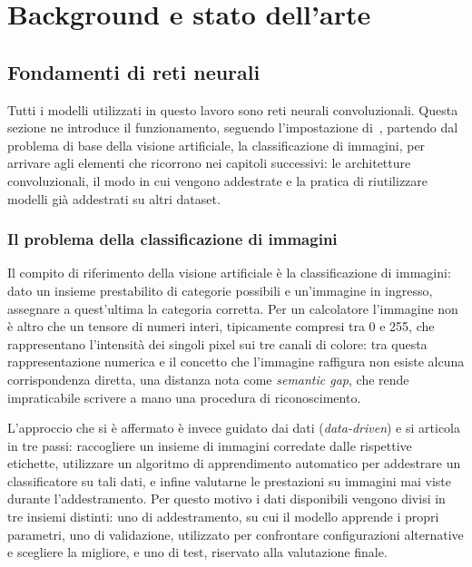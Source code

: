 \chapter{Background e stato dell'arte}
\label{chap:stato_arte}

\section{Fondamenti di reti neurali}
\label{sec:fondamenti_nn}

Tutti i modelli utilizzati in questo lavoro sono reti neurali
convoluzionali. Questa sezione ne introduce il funzionamento, seguendo
l'impostazione di~\cite{goodfellow2016deep}, partendo
dal problema di base della visione artificiale, la classificazione di
immagini, per arrivare agli elementi che ricorrono nei capitoli
successivi: le architetture convoluzionali, il modo in cui vengono
addestrate e la pratica di riutilizzare modelli già addestrati su altri
dataset.

\subsection{Il problema della classificazione di immagini}
\label{sec:classificazione}

Il compito di riferimento della visione artificiale è la classificazione
di immagini: dato un insieme prestabilito di categorie possibili e
un'immagine in ingresso, assegnare a quest'ultima la categoria corretta.
Per un calcolatore l'immagine non è altro che un tensore di numeri
interi, tipicamente compresi tra 0 e 255, che rappresentano l'intensità
dei singoli pixel sui tre canali di colore: tra questa rappresentazione
numerica e il concetto che l'immagine raffigura non esiste alcuna
corrispondenza diretta, una distanza nota come \emph{semantic gap}, che
rende impraticabile scrivere a mano una procedura di riconoscimento.

L'approccio che si è affermato è invece guidato dai dati
(\emph{data-driven}) e si articola in tre passi: raccogliere un insieme
di immagini corredate dalle rispettive etichette, utilizzare un
algoritmo di apprendimento automatico per addestrare un classificatore
su tali dati, e infine valutarne le prestazioni su immagini mai viste
durante l'addestramento. Per questo motivo i dati disponibili vengono
divisi in tre insiemi distinti: uno di addestramento, su cui il modello
apprende i propri parametri, uno di validazione, utilizzato per
confrontare configurazioni alternative e scegliere la migliore, e uno di
test, riservato alla valutazione finale.

